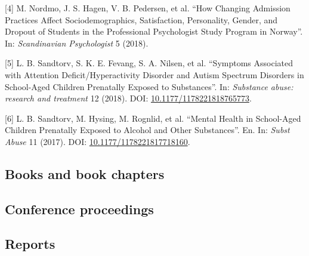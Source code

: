 \documentclass[]{article}
\begin{document}
{[}4{]} M. Nordmo, J. S. Hagen, V. B. Pedersen, et al. ``How Changing
Admission Practices Affect Sociodemographics, Satisfaction, Personality,
Gender, and Dropout of Students in the Professional Psychologist Study
Program in Norway''. In: \emph{Scandinavian Psychologist} 5 (2018).

{[}5{]} L. B. Sandtorv, S. K. E. Fevang, S. A. Nilsen, et al. ``Symptoms
Associated with Attention Deficit/Hyperactivity Disorder and Autism
Spectrum Disorders in School-Aged Children Prenatally Exposed to
Substances''. In: \emph{Substance abuse: research and treatment} 12
(2018). DOI:
\href{https://doi.org/10.1177/1178221818765773}{10.1177/1178221818765773}.

{[}6{]} L. B. Sandtorv, M. Hysing, M. Rognlid, et al. ``Mental Health in
School-Aged Children Prenatally Exposed to Alcohol and Other
Substances''. En. In: \emph{Subst Abuse} 11 (2017). DOI:
\href{https://doi.org/10.1177/1178221817718160}{10.1177/1178221817718160}.

\hypertarget{books-and-book-chapters}{%
\subsection{Books and book chapters}\label{books-and-book-chapters}}

\hypertarget{conference-proceedings}{%
\subsection{Conference proceedings}\label{conference-proceedings}}

\hypertarget{reports}{%
\subsection{Reports}\label{reports}}
\end{document}
